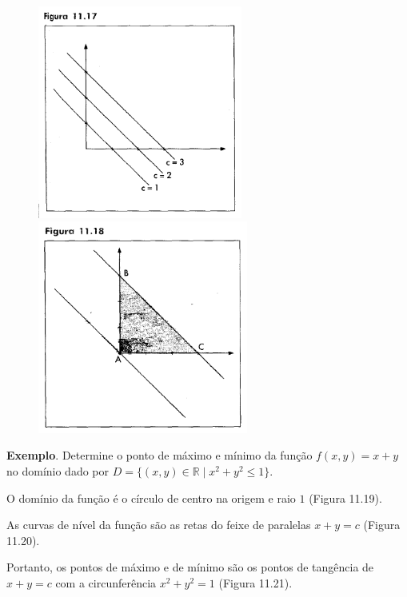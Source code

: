 \begin{enumerate}[label=\alph*)]
			\begin{figure}[H]
				\includegraphics[height=7cm]{images/morettin_figura-11-17}
				\includegraphics[height=7cm]{images/morettin_figura-11-18}
			\end{figure}

		\end{enumerate}

		\textbf{Exemplo}. Determine o ponto de máximo e mínimo da função $f(x, y) = x + y$ no domínio dado por $D = \{(x, y) \in \mathbb{R} \mid x^{2} + y^{2} \leq 1\}$.

		\medskip

		O domínio da função é o círculo de centro na origem e raio $1$ (Figura 11.19).

		As curvas de nível da função são as retas do feixe de paralelas $x + y = c$ (Figura 11.20).

		Portanto, os pontos de máximo e de mínimo são os pontos de tangência de $x + y = c$ com a circunferência $x^{2} + y^{2} = 1$ (Figura 11.21).

